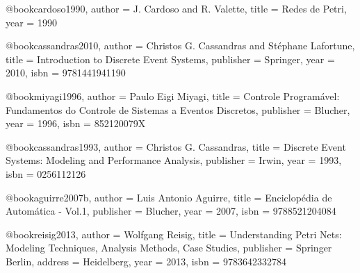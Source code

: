 


%

%

%

@book{cardoso1990,
  author = {J. Cardoso and R. Valette},
  title = {Redes de Petri},
  year = {1990}
}

@book{cassandras2010,
  author = {Christos G. Cassandras and Stéphane Lafortune},
  title = {Introduction to Discrete Event Systems},
  publisher = {Springer},
  year = {2010},
  isbn = {9781441941190}
}

@book{miyagi1996,
  author = {Paulo Eigi Miyagi},
  title = {Controle Programável: Fundamentos do Controle de Sistemas a Eventos Discretos},
  publisher = {Blucher},
  year = {1996},
  isbn = {852120079X}
}

@book{cassandras1993,
  author = {Christos G. Cassandras},
  title = {Discrete Event Systems: Modeling and Performance Analysis},
  publisher = {Irwin},
  year = {1993},
  isbn = {0256112126}
}

@book{aguirre2007b,
  author = {Luis Antonio Aguirre},
  title = {Enciclopédia de Automática - Vol.1},
  publisher = {Blucher},
  year = {2007},
  isbn = {9788521204084}
}

@book{reisig2013,
  author = {Wolfgang Reisig},
  title = {Understanding Petri Nets: Modeling Techniques, Analysis Methods, Case Studies},
  publisher = {Springer Berlin},
  address = {Heidelberg},
  year = {2013},
  isbn = {9783642332784}
}

